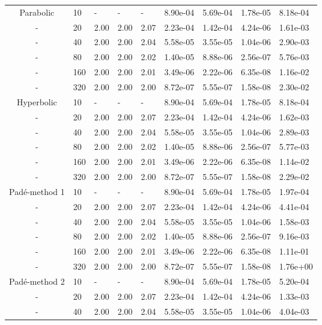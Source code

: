 \begin{table}[htbp]
{\begin{tabular}{cllllllll}
   \hline
      Parabolic  & 10 & - & - & - & 8.90e-04 & 5.69e-04 & 1.78e-05 & 8.18e-04 \\ 
      - &   20 & 2.00 & 2.00 & 2.07 & 2.23e-04 & 1.42e-04 & 4.24e-06 & 1.61e-03 \\ 
      - &   40 & 2.00 & 2.00 & 2.04 & 5.58e-05 & 3.55e-05 & 1.04e-06 & 2.90e-03 \\ 
      - &   80 & 2.00 & 2.00 & 2.02 & 1.40e-05 & 8.88e-06 & 2.56e-07 & 5.76e-03 \\ 
      - &  160 & 2.00 & 2.00 & 2.01 & 3.49e-06 & 2.22e-06 & 6.35e-08 & 1.16e-02 \\ 
      - &  320 & 2.00 & 2.00 & 2.00 & 8.72e-07 & 5.55e-07 & 1.58e-08 & 2.30e-02 \\ 
   \hline
     Hyperbolic  & 10 & - & - & - & 8.90e-04 & 5.69e-04 & 1.78e-05 & 8.18e-04 \\ 
     - &   20 & 2.00 & 2.00 & 2.07 & 2.23e-04 & 1.42e-04 & 4.24e-06 & 1.62e-03 \\ 
     - &   40 & 2.00 & 2.00 & 2.04 & 5.58e-05 & 3.55e-05 & 1.04e-06 & 2.89e-03 \\ 
     - &   80 & 2.00 & 2.00 & 2.02 & 1.40e-05 & 8.88e-06 & 2.56e-07 & 5.77e-03 \\ 
     - &  160 & 2.00 & 2.00 & 2.01 & 3.49e-06 & 2.22e-06 & 6.35e-08 & 1.14e-02 \\ 
     - &  320 & 2.00 & 2.00 & 2.00 & 8.72e-07 & 5.55e-07 & 1.58e-08 & 2.29e-02 \\ 
   \hline
   Pad\'e-method 1 &  10 & - & - & - & 8.90e-04 & 5.69e-04 & 1.78e-05 & 1.97e-04 \\ 
   - &   20 & 2.00 & 2.00 & 2.07 & 2.23e-04 & 1.42e-04 & 4.24e-06 & 4.41e-04 \\ 
   - &   40 & 2.00 & 2.00 & 2.04 & 5.58e-05 & 3.55e-05 & 1.04e-06 & 1.58e-03 \\ 
   - &   80 & 2.00 & 2.00 & 2.02 & 1.40e-05 & 8.88e-06 & 2.56e-07 & 9.16e-03 \\ 
   - &  160 & 2.00 & 2.00 & 2.01 & 3.49e-06 & 2.22e-06 & 6.35e-08 & 1.11e-01 \\ 
   - &  320 & 2.00 & 2.00 & 2.00 & 8.72e-07 & 5.55e-07 & 1.58e-08 & 1.76e+00 \\ 
   \hline
   Pad\'e-method 2 &  10 & - & - & - & 8.90e-04 & 5.69e-04 & 1.78e-05 & 5.20e-04 \\ 
   - &    20 & 2.00 & 2.00 & 2.07 & 2.23e-04 & 1.42e-04 & 4.24e-06 & 1.33e-03 \\ 
   - &    40 & 2.00 & 2.00 & 2.04 & 5.58e-05 & 3.55e-05 & 1.04e-06 & 4.04e-03 \\ 

\end{tabular}}
\end{table}
